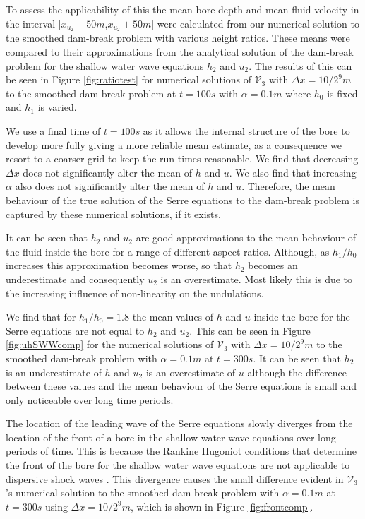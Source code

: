 \documentclass[times]{elsarticle}
\begin{document}
To assess the applicability of this the mean bore depth and mean fluid velocity in the interval [$x_{u_2}-50m$,$x_{u_2}+50m$] were calculated from our numerical solution to the smoothed dam-break problem with various height ratios. These means were compared to their approximations from the analytical solution of the dam-break problem for the shallow water wave equations $h_2$ and $u_2$. The results of this can be seen in Figure \ref{fig:ratiotest} for numerical solutions of $\mathcal{V}_3$ with $\Delta x = 10/2^{9}m$ to the smoothed dam-break problem at $t=100s$ with $\alpha = 0.1m$ where $h_0$ is fixed and $h_1$ is varied.

We use a final time of $t=100s$ as it allows the internal structure of the bore to develop more fully giving a more reliable mean estimate, as a consequence we resort to a coarser grid to keep the run-times reasonable. We find that decreasing $\Delta x$ does not significantly alter the mean of $h$ and $u$. We also find that increasing $\alpha$ also does not significantly alter the mean of $h$ and $u$. Therefore, the mean behaviour of the true solution of the Serre equations to the dam-break problem is captured by these numerical solutions, if it exists.

It can be seen that $h_2$ and $u_2$ are good approximations to the mean behaviour of the fluid inside the bore for a range of different aspect ratios. Although, as $h_1/h_0$ increases this approximation becomes worse, so that $h_2$ becomes an underestimate and consequently $u_2$ is an overestimate. Most likely this is due to the increasing influence of non-linearity on the undulations. 

We find that for $h_1/h_0 = 1.8$ the mean values of $h$ and $u$ inside the bore for the Serre equations are not equal to $h_2$ and $u_2$. This can be seen in Figure \ref{fig:uhSWWcomp} for the numerical solutions of $\mathcal{V}_3$ with $\Delta x = 10/2^{9}m$ to the smoothed dam-break problem with $\alpha = 0.1m$ at $t=300s$. It can be seen that $h_2$ is an underestimate of $h$ and $u_2$ is an overestimate of $u$ although the difference between these values and the mean behaviour of the Serre equations is small and only noticeable over long time periods.

The location of the leading wave of the Serre equations slowly diverges from the location of the front of a bore in the shallow water wave equations over long periods of time. This is because the Rankine Hugoniot conditions that determine the front of the bore for the shallow water wave equations are not applicable to dispersive shock waves \cite{El-Hoefer-2016-11}. This divergence causes the small difference evident in $\mathcal{V}_3$'s numerical solution to the smoothed dam-break problem with $\alpha =0.1m$ at $t=300s$ using $\Delta x = 10/2^{9}m$, which is shown in Figure \ref{fig:frontcomp}.
\end{document}
